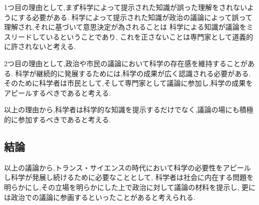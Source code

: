 \documentclass[uplatex,a4j,11pt,dvipdfmx]{jsarticle}
\begin{document}
1つ目の理由として,まず科学によって提示された知識が誤った理解をされないようにする必要がある.
科学によって提示された知識が政治の議論によって誤って理解され,それに基づいて意思決定が為されることは
科学による知識が議論をミスリードしているということであり,
これを正さないことは専門家として道義的に許されないと考える.

2つ目の理由として,政治や市民の議論において科学の存在感を維持することがある.
科学が継続的に発展するためには,科学の成果が広く認識される必要がある.
そのために科学者は市民として,そして専門家として議論に参加し,科学の成果をアピールするべきであると考える.

以上の理由から,科学者は科学的な知識を提示するだけでなく,議論の場にも積極的に参加するべきであると考える.
\subsection*{結論}
以上の議論から,トランス・サイエンスの時代において科学の必要性をアピールし科学が発展し続けるために必要なこととして,
科学者は社会に内在する問題を明らかにし,その立場を明らかにした上で政治に対して議論の材料を提示し,
更には政治での議論に参画するといったことがあると考えられる.

\end{document}
